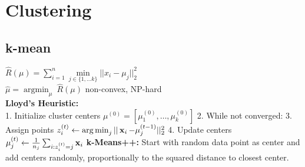 \section*{Clustering}
\subsection*{k-mean}

$\hat{R}(\mu) = \sum_{i=1}^n \underset{j\in\{1,...k\}}{\operatorname{min}}||x_i-\mu_j||_2^2$\\
$\hat{\mu} = {\operatorname{argmin}_{\mu}} ~ \hat{R}(\mu)$ non-convex, NP-hard \\
\textbf{Lloyd's Heuristic:}\\
1. Initialize cluster centers $\mu^{(0)}=[\mu_1^{(0)},\ldots,\mu_k^{(0)}]$
2. While not converged:
3. Assign points $z_i^{(t)}\leftarrow \operatorname*{arg\,min}_j||\operatorname*{\mathbf{x}}_i-\mu_j^{(t-1)}||_2^2$
4. Update centers $\mu_j^{(t)}\leftarrow\frac{1}{n_j}\sum_{i:z_i^{(t)}=j}\operatorname*{\mathbf{x}}_i$
\textbf{k-Means++:} Start with random data point as center and add centers randomly, proportionally to the squared distance to closest center.

